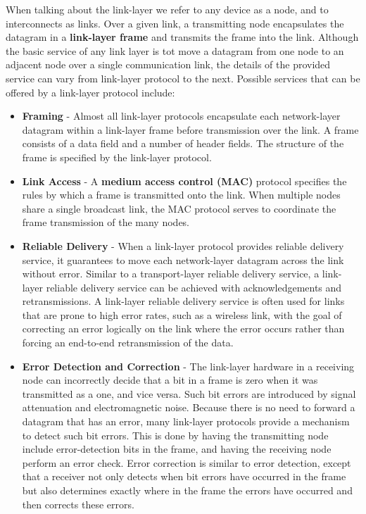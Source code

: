 When talking about the link-layer we refer to any device as a node, and to interconnects as links. Over a given link, a transmitting node encapsulates the datagram in a \textbf{link-layer frame} and transmits the frame into the link. Although the basic service of any link layer is tot move a datagram from one node to an adjacent node over a single communication link, the details of the provided service can vary from link-layer protocol to the next. Possible services that can be offered by a link-layer protocol include:
\begin{itemize}
\item \textbf{Framing} - Almost all link-layer protocols encapsulate each network-layer datagram within a link-layer frame before transmission over the link. A frame consists of a data field and a number of header fields. The structure of the frame is specified by the link-layer protocol.
\item \textbf{Link Access} - A \textbf{medium access control (MAC)} protocol specifies the rules by which a frame is transmitted onto the link. When multiple nodes share a single broadcast link, the MAC protocol serves to coordinate the frame transmission of the many nodes.\\
\item \textbf{Reliable Delivery} - When a link-layer protocol provides reliable delivery service, it guarantees to move each network-layer datagram across the link without error. Similar to a transport-layer reliable delivery service, a link-layer reliable delivery service can be achieved with acknowledgements and retransmissions. A link-layer reliable delivery service is often used for links that are prone to high error rates, such as a wireless link, with the goal of correcting an error logically on the link where the error occurs rather than forcing an end-to-end retransmission of the data.
\item \textbf{Error Detection and Correction} - The link-layer hardware in a receiving node can incorrectly decide that a bit in a frame is zero when it was transmitted as a one, and vice versa. Such bit errors are introduced by signal attenuation and electromagnetic noise. Because there is no need to forward a datagram that has an error, many link-layer protocols provide a mechanism to detect such bit errors. This is done by having the transmitting node include error-detection bits in the frame, and having the receiving node perform an error check. Error correction is similar to error detection, except that a receiver not only detects when bit errors have occurred in the frame but also determines exactly where in the frame the errors have occurred and then corrects these errors.
\end{itemize}


